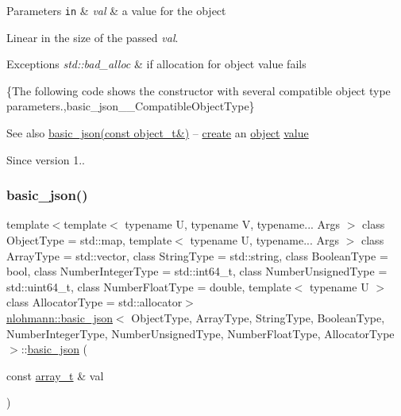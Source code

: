 \begin{DoxyParams}[1]{Parameters}
\mbox{\tt in}  & {\em val} & a value for the object\\
\hline
\end{DoxyParams}
Linear in the size of the passed {\itshape val}.


\begin{DoxyExceptions}{Exceptions}
{\em std\+::bad\+\_\+alloc} & if allocation for object value fails\\
\hline
\end{DoxyExceptions}
\{The following code shows the constructor with several compatible object type parameters.,basic\+\_\+json\+\_\+\+\_\+\+Compatible\+Object\+Type\}

\begin{DoxySeeAlso}{See also}
\hyperlink{classnlohmann_1_1basic__json_a9af5ea68c88f423ddf35216aff7f1813}{basic\+\_\+json(const object\+\_\+t\&)} -- \hyperlink{classnlohmann_1_1basic__json_afdb7a485369fbfd8c4c7c134ebb1feb5}{create} an \hyperlink{classnlohmann_1_1basic__json_ad25b2f8c21e241e2d63455537a9294ff}{object} \hyperlink{classnlohmann_1_1basic__json_a407e73a037e6e3067ef7aa2c25a79f39}{value}
\end{DoxySeeAlso}
\begin{DoxySince}{Since}
version 1.. 
\end{DoxySince}
\hypertarget{classnlohmann_1_1basic__json_a3aaf41d385f0d9a93deb92f9b14ae0cf}{}\label{classnlohmann_1_1basic__json_a3aaf41d385f0d9a93deb92f9b14ae0cf} 
\subsubsection{\texorpdfstring{basic\+\_\+json()}{basic\_json()}\hspace{0.1cm}{\footnotesize\ttfamily [5/23]}}
{\footnotesize\ttfamily template$<$template$<$ typename U, typename V, typename... Args $>$ class Object\+Type = std\+::map, template$<$ typename U, typename... Args $>$ class Array\+Type = std\+::vector, class String\+Type  = std\+::string, class Boolean\+Type  = bool, class Number\+Integer\+Type  = std\+::int64\+\_\+t, class Number\+Unsigned\+Type  = std\+::uint64\+\_\+t, class Number\+Float\+Type  = double, template$<$ typename U $>$ class Allocator\+Type = std\+::allocator$>$ \\
\hyperlink{classnlohmann_1_1basic__json}{nlohmann\+::basic\+\_\+json}$<$ Object\+Type, Array\+Type, String\+Type, Boolean\+Type, Number\+Integer\+Type, Number\+Unsigned\+Type, Number\+Float\+Type, Allocator\+Type $>$\+::\hyperlink{classnlohmann_1_1basic__json}{basic\+\_\+json} (\begin{DoxyParamCaption}\item[{const \hyperlink{classnlohmann_1_1basic__json_ab00b882d39306d663c23dab110f5cae0}{array\+\_\+t} \&}]{val }\end{DoxyParamCaption})\hspace{0.3cm}{\ttfamily [inline]}}



